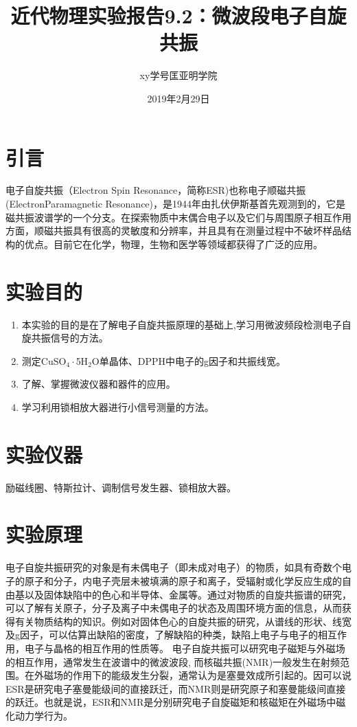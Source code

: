 \documentclass[a4paper]{article}
\title{近代物理实验报告9.2：微波段电子自旋共振}
\author{xy\quad 学号\quad 匡亚明学院}
\date{2019年2月29日}
\begin{document}
\maketitle


\section{引言}
电子自旋共振（Electron Spin Resonance，简称ESR)也称电子顺磁共振 (ElectronParamagnetic Resonance)，是1944年由扎伏伊斯基首先观测到的，它是磁共振波谱学的一个分支。在探索物质中末偶合电子以及它们与周围原子相互作用方面，顺磁共振具有很高的灵敏度和分辨率，并且具有在测量过程中不破坏样品结构的优点。目前它在化学，物理，生物和医学等领域都获得了广泛的应用。

\section{实验目的}
\begin{enumerate}
\item 本实验的目的是在了解电子自旋共振原理的基础上,学习用微波频段检测电子自旋共振信号的方法。
\item 测定CuSO$_4\cdot$5H$_2$O单晶体、DPPH中电子的g因子和共振线宽。
\item 了解、掌握微波仪器和器件的应用。
\item 学习利用锁相放大器进行小信号测量的方法。
\end{enumerate}

\section{实验仪器}
励磁线圈、特斯拉计、调制信号发生器、锁相放大器。

\section{实验原理}
电子自旋共振研究的对象是有未偶电子（即未成对电子）的物质，如具有奇数个电子的原子和分子，内电子壳层未被填满的原子和离子，受辐射或化学反应生成的自由基以及固体缺陷中的色心和半导体、金属等。通过对物质的自旋共振谱的研究，可以了解有关原子，分子及离子中未偶电子的状态及周围环境方面的信息，从而获得有关物质结构的知识。例如对固体色心的自旋共振的研究，从谱线的形状、线宽及g因子，可以估算出缺陷的密度，了解缺陷的种类，缺陷上电子与电子的相互作用，电子与晶格的相互作用的性质等。
电子自旋共振可以研究电子磁矩与外磁场的相互作用，通常发生在波谱中的微波波段, 而核磁共振(NMR)一般发生在射频范围。在外磁场的作用下的能级发生分裂，通常认为是塞曼效成所引起的。因可以说ESR是研究电子塞曼能级间的直接跃迁，而NMR则是研究原子和塞曼能级间直接的跃迁。也就是说，ESR和NMR是分别研究电子自旋磁矩和核磁矩在外磁场中磁化动力学行为。
\end{document}
